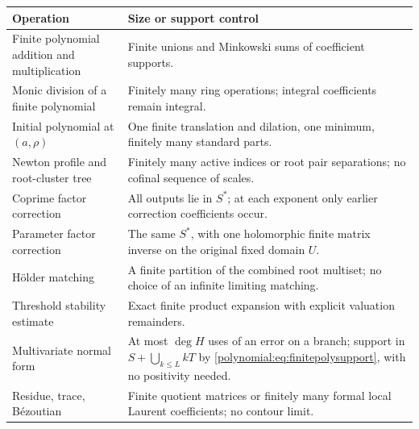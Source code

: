\documentclass[11pt,letterpaper]{article}
\numberwithin{equation}{section}
\theoremstyle{definition}
\theoremstyle{remark}\newtheorem{remark}[theorem]{Remark}
\begin{document}
\begin{center}
\begin{tabularx}{\textwidth}{@{}LL@{}}
\toprule
Operation & Size or support control\\
\midrule
Finite polynomial addition and multiplication & Finite unions and Minkowski
sums of coefficient supports.\\[0.4em]
Monic division of a finite polynomial & Finitely many ring operations;
integral coefficients remain integral.\\[0.4em]
Initial polynomial at $(a,\rho)$ & One finite translation and dilation, one
minimum, finitely many standard parts.\\[0.4em]
Newton profile and root-cluster tree & Finitely many active indices or root
pair separations; no cofinal sequence of scales.\\[0.4em]
Coprime factor correction & All outputs lie in $S^*$; at each exponent only
earlier correction coefficients occur.\\[0.4em]
Parameter factor correction & The same $S^*$, with one holomorphic finite
matrix inverse on the original fixed domain $U$.\\[0.4em]
H\"older matching & A finite partition of the combined root multiset; no
choice of an infinite limiting matching.\\[0.4em]
Threshold stability estimate & Exact finite product expansion with explicit
valuation remainders.\\[0.4em]
Multivariate normal form & At most $\deg H$ uses of an error on a branch;
support in $S+\bigcup_{k\le L}kT$ by
\eqref{polynomial:eq:finitepolysupport}, with no positivity needed.\\[0.4em]
Residue, trace, B\'ezoutian & Finite quotient matrices or finitely many formal
local Laurent coefficients; no contour limit.\\
\bottomrule
\end{tabularx}
\end{center}
\end{document}
